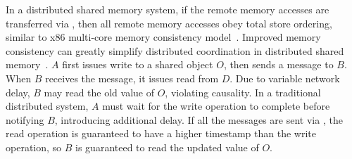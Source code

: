 In a distributed shared memory system, if the remote memory accesses are transferred via \sys, then all remote memory accesses obey total store ordering, similar to x86 multi-core memory consistency model~\cite{sewell2010x86}. Improved memory consistency can greatly simplify distributed coordination in distributed shared memory~\cite{sewell2010x86}.
 $A$ first issues write to a shared object $O$, then sends a message to $B$. When $B$ receives the message, it issues read from $D$. Due to variable network delay, $B$ may read the old value of $O$, violating causality. In a traditional distributed system, $A$ must wait for the write operation to complete before notifying $B$, introducing additional delay. If all the messages are sent via \sys, the read operation is guaranteed to have a higher timestamp than the write operation, so $B$ is guaranteed to read the updated value of $O$.

